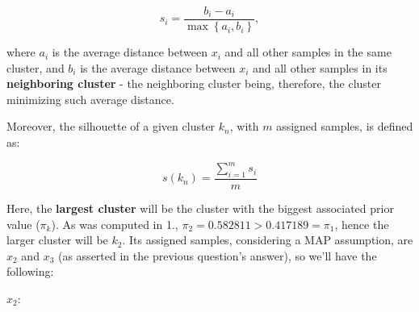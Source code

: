 \documentclass[12pt]{article}
\begin{document}
\begin{enumerate}[leftmargin=\labelsep]
\begin{enumerate}[leftmargin=\labelsep]
                \begin{equation*}
                  s_i = \frac{b_i - a_i}{\max\left\{a_i, b_i\right\}},
                \end{equation*}

                where $a_i$ is the average distance between $x_i$ and all other samples
                in the same cluster, and $b_i$ is the average distance between $x_i$ and all
                other samples in its \textbf{neighboring cluster} - the neighboring
                cluster being, therefore, the cluster minimizing such average distance.

                Moreover, the silhouette of a given cluster $k_n$, with $m$ assigned samples, is defined as:

                \begin{equation*}
                  s(k_n) = \frac{\sum_{i=1}^m s_i}{m}
                \end{equation*}

                Here, the \textbf{largest cluster} will be the cluster with the
                biggest associated prior value ($\pi_k$). As was computed in 1.,
                $\pi_2 = 0.582811 > 0.417189 = \pi_1$,
                hence the larger cluster will be $k_2$. Its assigned samples,
                considering a MAP assumption, are $x_2$ and $x_3$ (as asserted
                in the previous question's answer), so we'll have the following:

                \vspace*{0.5cm}

                \begin{paracol}{2}
                  \setlength{\columnseprule}{1pt}
                  \def\columnseprulecolor{\color{black}}
                  \centering

                  $x_2$:


\end{paracol}
\end{enumerate}
\end{enumerate}
\end{document}
